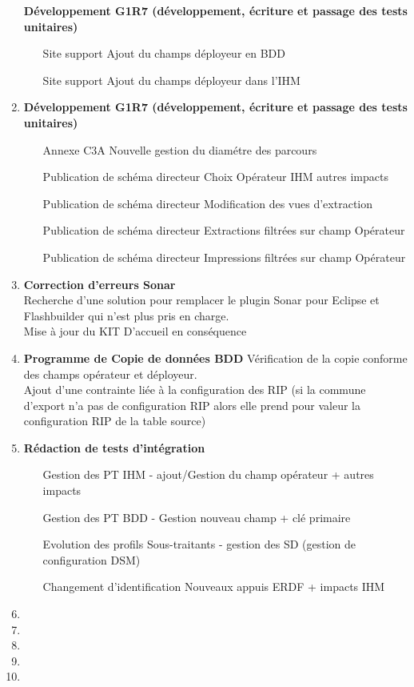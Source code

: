 \begin{enumerate}[label= Semaine \no\textbf{\arabic*.},itemsep=20pt]
\begin{enumerate}[label = Correction \no\arabic*.,align=left]
\end{enumerate}
\textbf{Développement G1R7 (développement, écriture et passage des tests unitaires)}
\begin{enumerate}[label = Développement \no\arabic*.,align=left]
	\item [Site support] Ajout du champs déployeur en BDD
	\item [Site support] Ajout du champs déployeur dans l'IHM
\end{enumerate}
\item
\textbf{Développement G1R7 (développement, écriture et passage des tests unitaires)}
\begin{enumerate}[label = Développement \no\arabic*.,align=left]
	\item [Annexe C3A] Nouvelle gestion du diamétre des parcours
	\item [Publication de schéma directeur] Choix Opérateur IHM autres impacts
	\item [Publication de schéma directeur] Modification des vues d'extraction
	\item [Publication de schéma directeur] Extractions filtrées sur champ Opérateur
	\item [Publication de schéma directeur] Impressions filtrées sur champ Opérateur
\end{enumerate}

\item
\textbf{Correction d'erreurs Sonar}
\\Recherche d'une solution pour remplacer le plugin Sonar pour Eclipse et Flashbuilder qui n'est plus pris en charge.
\\Mise à jour du KIT D'accueil en conséquence

\item
\textbf{Programme de Copie de données BDD} Vérification de la copie conforme des champs opérateur et déployeur.
\\ Ajout d'une contrainte liée à la configuration des RIP (si la commune d'export n'a pas
de configuration RIP alors elle prend pour valeur la configuration RIP de la table source)
\item
\textbf{Rédaction de tests d'intégration}
\begin{enumerate}[label = Développement \no\arabic*.,align=left]
	\item [Gestion des PT]  IHM - ajout/Gestion du champ opérateur + autres impacts
	\item [Gestion des PT]  BDD - Gestion nouveau champ + clé primaire
	\item [Evolution des profils] Sous-traitants - gestion des SD (gestion de configuration DSM)
	\item [Changement d’identification] Nouveaux appuis ERDF  + impacts IHM
\end{enumerate}
\item
\item
\item
\item
\item
\end{enumerate}
